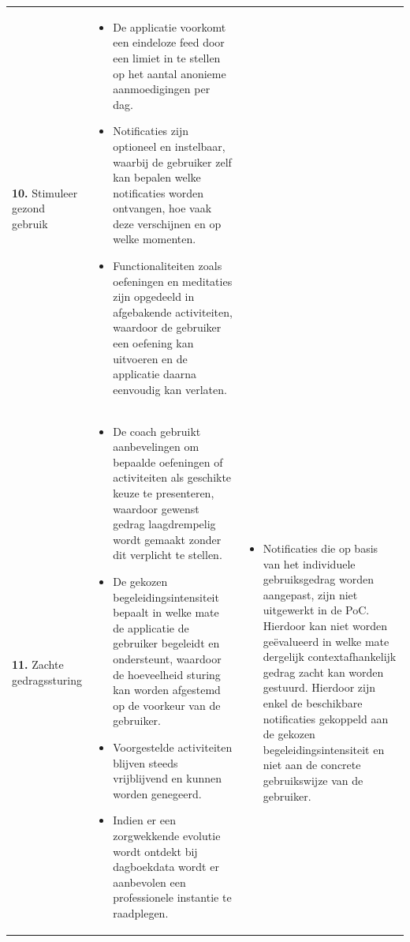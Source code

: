 {\begin{longtable}{
            >{\raggedright\arraybackslash}p{5.23cm}
            >{\raggedright\arraybackslash}p{4.93cm}
            >{\raggedright\arraybackslash}p{4.93cm}
        }
        \addlinespace[5pt]
        
        \textbf{10.} Stimuleer gezond gebruik
        &  
        \begin{itemize}[nosep,leftmargin=*,itemsep=10pt] 
            \renewcommand{\labelitemi}{+} 
            \item De applicatie voorkomt een eindeloze feed door een limiet in te stellen op het aantal anonieme aanmoedigingen per dag.
            \item Notificaties zijn optioneel en instelbaar, waarbij de gebruiker zelf kan bepalen welke notificaties worden ontvangen, hoe vaak deze verschijnen en op welke momenten.
            \item Functionaliteiten zoals oefeningen en meditaties zijn opgedeeld in afgebakende activiteiten, waardoor de gebruiker een oefening kan uitvoeren en de applicatie daarna eenvoudig kan verlaten.
        \end{itemize} 
        &
        \\
        
        \addlinespace[5pt]
        
        \textbf{11.} Zachte gedragssturing
        &  
        \begin{itemize}[nosep,leftmargin=*,itemsep=10pt] 
            \renewcommand{\labelitemi}{+}
            \item De coach gebruikt aanbevelingen om bepaalde oefeningen of activiteiten als geschikte keuze te presenteren, waardoor gewenst gedrag laagdrempelig wordt gemaakt zonder dit verplicht te stellen.
            \item De gekozen begeleidingsintensiteit bepaalt in welke mate de applicatie de gebruiker begeleidt en ondersteunt, waardoor de hoeveelheid sturing kan worden afgestemd op de voorkeur van de gebruiker.
            \item Voorgestelde activiteiten blijven steeds vrijblijvend en kunnen worden genegeerd.
            \item Indien er een zorgwekkende evolutie wordt ontdekt bij dagboekdata wordt er aanbevolen een professionele instantie te raadplegen.
        \end{itemize} 
        &  
        \begin{itemize}[nosep,leftmargin=*,itemsep=10pt] 
            \renewcommand{\labelitemi}{-} 
            \item Notificaties die op basis van het individuele gebruiksgedrag worden aangepast, zijn niet uitgewerkt in de PoC. Hierdoor kan niet worden geëvalueerd in welke mate dergelijk contextafhankelijk gedrag zacht kan worden gestuurd. Hierdoor zijn enkel de beschikbare notificaties gekoppeld aan de gekozen begeleidingsintensiteit en niet aan de concrete gebruikswijze van de gebruiker.
        \end{itemize} 
        \\
        

\end{longtable}}
